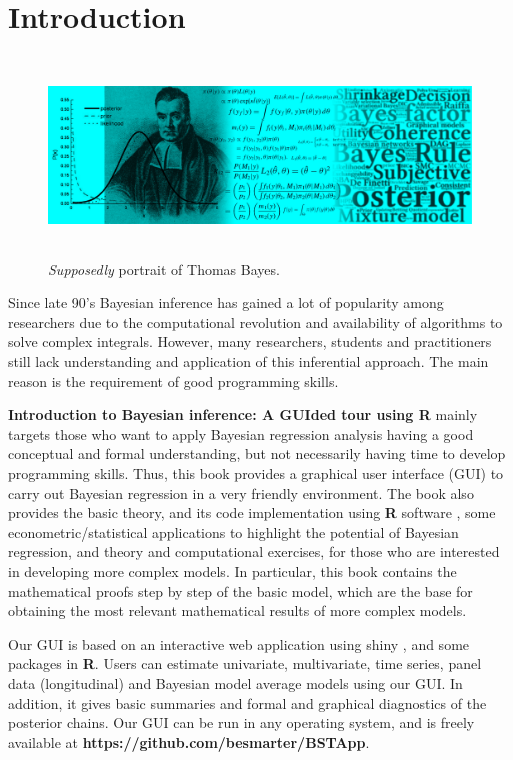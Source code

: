 \chapter*{Introduction}
\begin{figure}[h]
	\includegraphics[width=340pt, height=150pt]{frontmatter/figures/BannerBook.jpg}
	\caption[List of figure caption goes here]{\textit{Supposedly} portrait of Thomas Bayes.}\label{fig01}
\end{figure}

Since late 90’s Bayesian inference has gained a lot of popularity among researchers due to the computational revolution and availability of algorithms to solve complex integrals. However, many researchers, students and practitioners still lack understanding and application of this inferential approach. The main reason is the requirement of good programming skills.

\textbf{Introduction to Bayesian inference: A GUIded tour using R} mainly targets those who want to apply Bayesian regression analysis having a good conceptual and formal understanding, but not necessarily having time to develop programming skills. Thus, this book provides a graphical user interface (GUI) to carry out Bayesian regression in a very friendly environment. The book also provides the basic theory, and its code implementation using \textbf{R} software \cite{R2021}, some econometric/statistical applications to highlight the potential of Bayesian regression, and theory and computational exercises, for those who are interested in developing more complex models. In particular, this book contains the mathematical proofs step by step of the basic model, which are the base for obtaining the most relevant mathematical results of more complex models.

Our GUI is based on an interactive web application using shiny \cite{Chang2018}, and some packages in \textbf{R}. Users can estimate univariate, multivariate, time series, panel data (longitudinal) and Bayesian model average models using our GUI. In addition, it gives basic summaries and formal and graphical diagnostics of the posterior chains. Our GUI can be run in any operating system, and is freely available at \textbf{https://github.com/besmarter/BSTApp}. 

